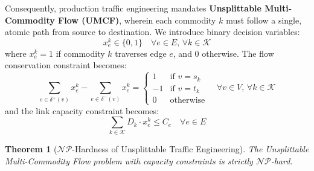 \documentclass[12pt,a4paper,oneside]{report}
\newtheorem{theorem}{Theorem}[chapter]
\begin{document}
Consequently, production traffic engineering mandates \textbf{Unsplittable Multi-Commodity Flow (UMCF)}, wherein each commodity $k$ must follow a single, atomic path from source to destination. We introduce binary decision variables:
\begin{equation}
    x_e^k \in \{0, 1\} \quad \forall e \in E, \, \forall k \in \mathcal{K}
\end{equation}
where $x_e^k = 1$ if commodity $k$ traverses edge $e$, and $0$ otherwise. The flow conservation constraint becomes:
\begin{equation}
    \sum_{e \in \delta^+(v)} x_e^k - \sum_{e \in \delta^-(v)} x_e^k = \begin{cases}
        1 & \text{if } v = s_k \\
        -1 & \text{if } v = t_k \\
        0 & \text{otherwise}
    \end{cases} \quad \forall v \in V, \, \forall k \in \mathcal{K}
\end{equation}
and the link capacity constraint becomes:
\begin{equation}
    \sum_{k \in \mathcal{K}} D_k \cdot x_e^k \le C_e \quad \forall e \in E
\end{equation}

\begin{theorem}[$\mathcal{NP}$-Hardness of Unsplittable Traffic Engineering]
The Unsplittable Multi-Commodity Flow problem with capacity constraints is strictly $\mathcal{NP}$-hard.
\end{theorem}
\end{document}
